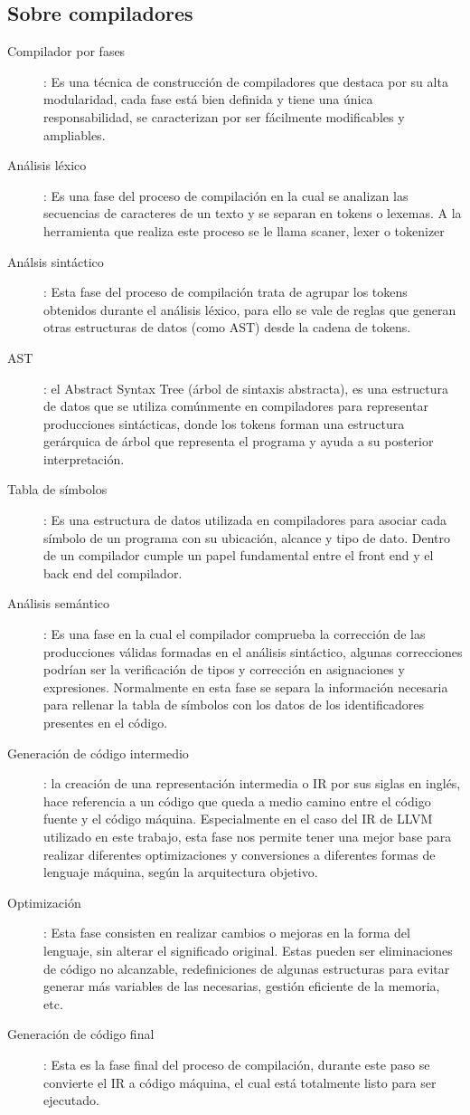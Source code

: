 \subsection{Sobre compiladores}
\begin{description}
    \item [Compilador por fases]: Es una técnica de construcción de compiladores que destaca por su alta modularidad, cada fase está bien definida y tiene una única responsabilidad, se caracterizan por ser fácilmente modificables y ampliables. 
    \item [Análisis léxico]: Es una fase del proceso de compilación en la cual se analizan las secuencias de caracteres de un texto y se separan en tokens o lexemas. A la herramienta que realiza este proceso se le llama scaner, lexer o tokenizer
    \item [Análsis sintáctico]: Esta fase del proceso de compilación trata de agrupar los tokens obtenidos durante el análisis léxico, para ello se vale de reglas que generan otras estructuras de datos (como AST) desde la cadena de tokens.
    \item [AST]: el Abstract Syntax Tree (árbol de sintaxis abstracta), es una estructura de datos que se utiliza comúnmente en compiladores para representar producciones sintácticas, donde los tokens forman una estructura gerárquica de árbol que representa el programa y ayuda a su posterior interpretación.
    \item [Tabla de símbolos]: Es una estructura de datos utilizada en compiladores para asociar cada símbolo de un programa con su ubicación, alcance y tipo de dato. Dentro de un compilador cumple un papel fundamental entre el front end y el back end del compilador.
    \item [Análisis semántico]: Es una fase en la cual el compilador comprueba la corrección de las producciones válidas formadas en el análisis sintáctico, algunas correcciones podrían ser la verificación de tipos y corrección en asignaciones y expresiones. Normalmente en esta fase se separa la información necesaria para rellenar la tabla de símbolos con los datos de los identificadores presentes en el código.
    \item [Generación de código intermedio]: la creación de una representación intermedia o IR por sus siglas en inglés, hace referencia a un código que queda a medio camino entre el código fuente y el código máquina. Especialmente en el caso del IR de LLVM utilizado en este trabajo, esta fase nos permite tener una mejor base para realizar diferentes optimizaciones y conversiones a diferentes formas de lenguaje máquina, según la arquitectura objetivo.
    \item [Optimización]: Esta fase consisten en realizar cambios o mejoras en la forma del lenguaje, sin alterar el significado original. Estas pueden ser eliminaciones de código no alcanzable, redefiniciones de algunas estructuras para evitar generar más variables de las necesarias, gestión eficiente de la memoria, etc.
    \item [Generación de código final]: Esta es la fase final del proceso de compilación, durante este paso se convierte el IR a código máquina, el cual está totalmente listo para ser ejecutado.
\end{description}